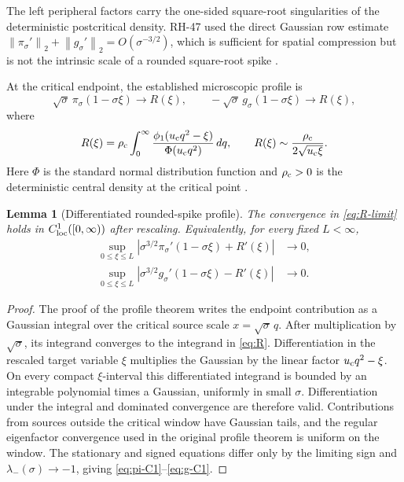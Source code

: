 \documentclass[11pt]{article}
\newtheorem{lemma}[theorem]{Lemma}
\theoremstyle{definition}
\theoremstyle{remark}
\newcommand{\norm}[1]{\left\lVert #1\right\rVert}
\begin{document}
The left peripheral factors carry the one-sided square-root singularities
of the deterministic postcritical density.  RH-47 used the direct Gaussian
row estimate
\(\norm{\pi_\sigma'}_2+\norm{g_\sigma'}_2
=O(\sigma^{-3/2})\), which is sufficient for spatial compression but is not
the intrinsic scale of a rounded square-root spike
\citep{WangLogConditioning2026}.

At the critical endpoint, the established microscopic profile is
\begin{equation}
 \sqrt{\sigma}\,\pi_\sigma(1-\sigma\xi)\longrightarrow R(\xi),
 \qquad
 -\sqrt{\sigma}\,g_\sigma(1-\sigma\xi)\longrightarrow R(\xi),
 \label{eq:R-limit}
\end{equation}
where
\begin{equation}
 R(\xi)
 =
 \rho_{\rm c}\int_0^\infty
 \frac{\phi_1(u_{\rm c}q^2-\xi)}
 {\Phi(u_{\rm c}q^2)}\,dq,
 \qquad
 R(\xi)\sim\frac{\rho_{\rm c}}{2\sqrt{u_{\rm c}\xi}}.
 \label{eq:R}
\end{equation}
Here \(\Phi\) is the standard normal distribution function and
\(\rho_{\rm c}>0\) is the deterministic central density at the critical
point \citep{WangBoundaryLayer2026,WangLogConditioning2026}.

\begin{lemma}[Differentiated rounded-spike profile]
\label{lem:C1-profile}
The convergence in \eqref{eq:R-limit} holds in
\(C^1_{\rm loc}([0,\infty))\) after rescaling.  Equivalently, for every
fixed \(L<\infty\),
\begin{align}
 \sup_{0\le\xi\le L}
 \left|
 \sigma^{3/2}\pi_\sigma'(1-\sigma\xi)+R'(\xi)
 \right|&\longrightarrow0,
 \label{eq:pi-C1}\\
 \sup_{0\le\xi\le L}
 \left|
 \sigma^{3/2}g_\sigma'(1-\sigma\xi)-R'(\xi)
 \right|&\longrightarrow0.
 \label{eq:g-C1}
\end{align}
\end{lemma}

\begin{proof}
The proof of the profile theorem writes the endpoint contribution as a
Gaussian integral over the critical source scale \(x=\sqrt{\sigma}\,q\).
After multiplication by \(\sqrt{\sigma}\), its integrand converges to the
integrand in \eqref{eq:R}.  Differentiation in the rescaled target variable
\(\xi\) multiplies the Gaussian by the linear factor
\(u_{\rm c}q^2-\xi\).  On every compact \(\xi\)-interval this differentiated
integrand is bounded by an integrable polynomial times a Gaussian,
uniformly in small \(\sigma\).  Differentiation under the integral and
dominated convergence are therefore valid.  Contributions from sources
outside the critical window have Gaussian tails, and the regular
eigenfactor convergence used in the original profile theorem is uniform on
the window.  The stationary and signed equations differ only by the
limiting sign and \(\lambda_-(\sigma)\to-1\), giving
\eqref{eq:pi-C1}--\eqref{eq:g-C1}.
\end{proof}
\end{document}
